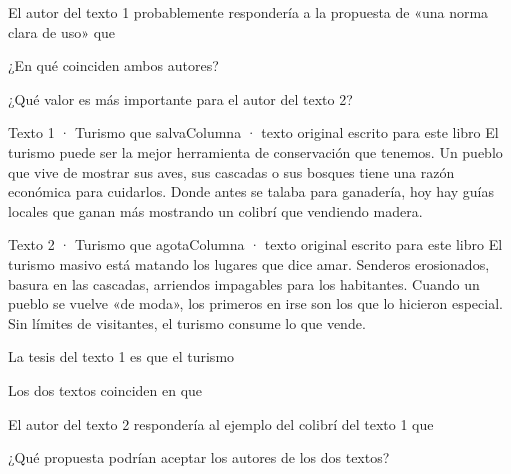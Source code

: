 \taller
{}
\begin{ejercicios}
\item El autor del texto 1 probablemente respondería a la propuesta de «una norma clara de uso» que
\item ¿En qué coinciden ambos autores?
\item ¿Qué valor es más importante para el autor del texto 2?
\end{ejercicios}

\bitacora

\evaluacion
\begin{texto}{Texto 1 · Turismo que salva}{Columna · texto original escrito para este libro}
\pa El turismo puede ser la mejor herramienta de conservación que tenemos. Un pueblo que vive de mostrar sus aves, sus
cascadas o sus bosques tiene una razón económica para cuidarlos. Donde antes se talaba para ganadería, hoy hay guías
locales que ganan más mostrando un colibrí que vendiendo madera.
\end{texto}
\begin{texto}{Texto 2 · Turismo que agota}{Columna · texto original escrito para este libro}
\pa El turismo masivo está matando los lugares que dice amar. Senderos erosionados, basura en las cascadas, arriendos
impagables para los habitantes. Cuando un pueblo se vuelve «de moda», los primeros en irse son los que lo hicieron
especial. Sin límites de visitantes, el turismo consume lo que vende.
\end{texto}
\begin{ejercicios}
\item La tesis del texto 1 es que el turismo
\item Los dos textos coinciden en que
\item El autor del texto 2 respondería al ejemplo del colibrí del texto 1 que
\item ¿Qué propuesta podrían aceptar los autores de los dos textos?
\end{ejercicios}
